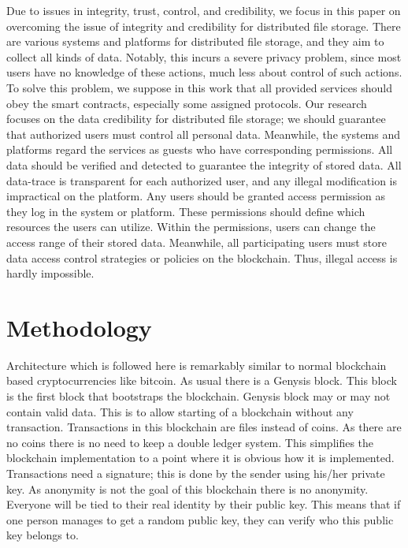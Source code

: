 \documentclass[conference]{IEEEtran}
\begin{document}
Due to issues in integrity, trust, control, and credibility, we focus in this paper on overcoming the issue of integrity and credibility for distributed file storage. There are various systems and platforms for distributed file storage, and they aim to collect all kinds of data. Notably, this incurs a severe privacy problem, since most users have no knowledge of these actions, much less about control of such actions. To solve this problem, we suppose in this work that all provided services should obey the smart contracts, especially some assigned protocols. Our research focuses on the data credibility for distributed file storage; we should guarantee that authorized users must control all personal data. Meanwhile, the systems and platforms regard the services as guests who have corresponding permissions. All data should be verified and detected to guarantee the integrity of stored data. All data-trace is transparent for each authorized user, and any illegal modification is impractical on the platform. Any users should be granted access permission as they log in the system or platform. These permissions should define which resources the users can utilize. Within the permissions, users can change the access range of their stored data. Meanwhile, all participating users must store data access control strategies or policies on the blockchain. Thus, illegal access is hardly impossible. 

\section{Methodology}
Architecture which is followed here is remarkably similar to normal blockchain based cryptocurrencies like bitcoin. As usual there is a Genysis block. This block is the first block that bootstraps the blockchain. Genysis block may or may not contain valid data. This is to allow starting of a blockchain without any transaction. Transactions in this blockchain are files instead of coins. As there are no coins there is no need to keep a double ledger system. This simplifies the blockchain implementation to a point where it is obvious how it is implemented. Transactions need a signature; this is done by the sender using his/her private key. As anonymity is not the goal of this blockchain there is no anonymity. Everyone will be tied to their real identity by their public key. This means that if one person manages to get a random public key, they can verify who this public key belongs to.  
\end{document}
